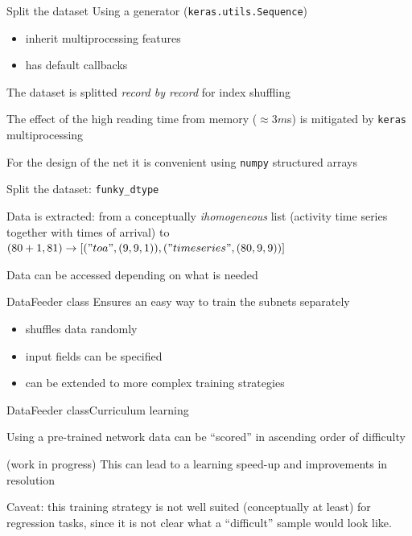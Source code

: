 \documentclass{beamer}
\begin{document}
\begin{frame}{Split the dataset}
    Using a generator (\texttt{keras.utils.Sequence})
    \begin{itemize}
        \item inherit multiprocessing features
        \item has default callbacks
    \end{itemize}
    The dataset is splitted \emph{record by record} for index shuffling

    The effect of the high reading time from memory ($\approx 3 m$s) is mitigated
    by \texttt{keras} multiprocessing
    
    For the design of the net it is convenient using \texttt{numpy} structured arrays
\end{frame}

\begin{frame}{Split the dataset: \texttt{funky\_dtype}}

    Data is extracted: from a conceptually \emph{ihomogeneous} list 
    (activity time series together with times of arrival) to
    $(80 + 1, 81) \rightarrow [("toa", (9, 9, 1)), ("timeseries", (80, 9,9))]$

    Data can be accessed depending on what is needed

\end{frame}


\begin{frame}{DataFeeder class}
    Ensures an easy way to train the subnets separately

    \begin{itemize}
        \item shuffles data randomly
        \item input fields can be specified
        \item can be extended to more complex training strategies
    \end{itemize}
    
\end{frame}

\begin{frame}{DataFeeder class}{Curriculum learning}

    Using a pre-trained network data can be ``scored'' in ascending order of difficulty

    (work in progress) This can lead to a learning speed-up and improvements in resolution
    
    Caveat: this training strategy is not well suited (conceptually at least) for regression tasks, 
    since it is not clear what a ``difficult'' sample would look like.
\end{frame}
\end{document}
